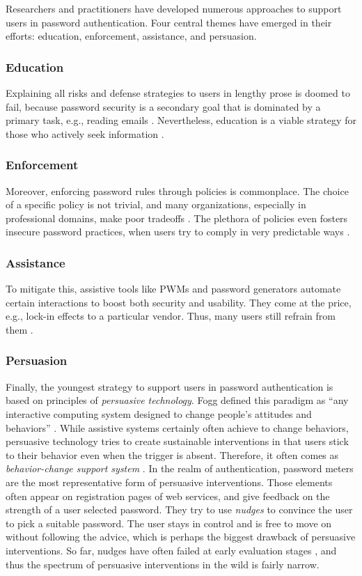 Researchers and practitioners have developed numerous approaches to support users in password authentication. Four central themes have emerged in their efforts: education, enforcement, assistance, and persuasion. 
\subsubsection{Education}
Explaining all risks and defense strategies to users in lengthy prose is doomed to fail, because password security is a secondary goal that is dominated by a primary task, e.g., reading emails \cite{Whitten1999WhyJohnnyCantEncrypt}. Nevertheless, education is a viable strategy for those who actively seek information \cite{Sasse2005UsableSecurityPosition}. 
\subsubsection{Enforcement}
Moreover, enforcing password rules through policies is commonplace. The choice of a specific policy is not trivial, and many organizations, especially in professional domains, make poor tradeoffs \cite{Florencio2010WhereDoPoliciesComeFrom, Shay2016DesigningPasswordPolicies}. The plethora of policies even fosters insecure password practices, when users try to comply in very predictable ways \cite{Inglesant2010TrueCostOfUnusablePolicies, Ur2015PWCreationLab}. 
\subsubsection{Assistance}
To mitigate this, assistive tools like \glspl{PWM} and password generators automate certain interactions to boost both security and usability. They come at the price, e.g., lock-in effects to a particular vendor. Thus, many users still refrain from them \cite{CSID2012PasswordHabits}. 
\subsubsection{Persuasion}
Finally, the youngest strategy to support users in password authentication is based on principles of \textit{persuasive technology}. Fogg defined this paradigm as ``any interactive computing system designed to change people's attitudes and behaviors'' \cite[p. 1]{Fogg2002Persuasive}. While assistive systems certainly often achieve to change behaviors, persuasive technology tries to create sustainable interventions in that users stick to their behavior even when the trigger is absent. Therefore, it often comes as \textit{behavior-change support system} \cite{Oinas-Kukkonen2013BCSS}. In the realm of authentication, password meters are the most representative form of persuasive interventions. Those elements often appear on registration pages of web services, and give feedback on the strength of a user selected password. They try to use \textit{nudges} \cite{Thaler2008Nudge} to convince the user to pick a suitable password. The user stays in control and is free to move on without following the advice, which is perhaps the biggest drawback of persuasive interventions. So far, nudges have often failed at early evaluation stages \cite{Renaud2017LessonsLearnedNudges}, and thus the spectrum of persuasive interventions in the wild is fairly narrow. 

